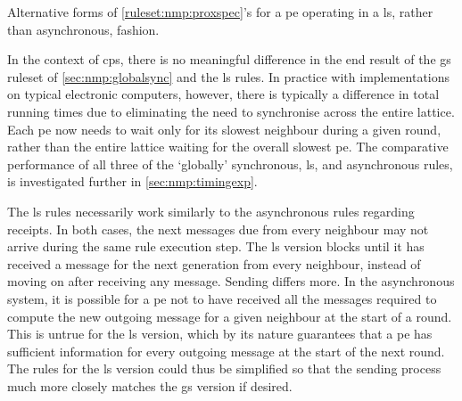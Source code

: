 \begin{cprulesetfloat}
    \begin{cpruleset}
    
        
        
        
    \end{cpruleset}
    \caption[Alternative forms of \cref{ruleset:nmp:proxspec}'s Rule 10]{\label{ruleset:nmp:localsync}Alternative forms of \cref{ruleset:nmp:proxspec}'s  for a \gls{pe} operating in a \gls{ls}, rather than asynchronous, fashion.}
\end{cprulesetfloat}

In the context of \gls{cps}, there is no meaningful difference in the end result of the \gls{gs} \gls{ruleset} of \cref{sec:nmp:globalsync} and the \gls{ls} rules.  In practice with implementations on typical electronic computers, however, there is typically a difference in total running times due to eliminating the need to synchronise across the entire lattice.  Each \gls{pe} now needs to wait only for its slowest neighbour during a given round, rather than the entire lattice waiting for the overall slowest \gls{pe}.  The comparative performance of all three of the `globally' synchronous, \gls{ls}, and asynchronous rules, is investigated further in \cref{sec:nmp:timingexp}.

The \gls{ls} rules necessarily work similarly to the asynchronous rules regarding receipts.  In both cases, the next messages due from every neighbour may not arrive during the same rule execution step.  The \gls{ls} version blocks until it has received a message for the next generation from every neighbour, instead of moving on after receiving any message.  Sending differs more.  In the asynchronous system, it is possible for a \gls{pe} not to have received all the messages required to compute the new outgoing message for a given neighbour at the start of a round.  This is untrue for the \gls{ls} version, which by its nature guarantees that a \gls{pe} has sufficient information for every outgoing message at the start of the next round.  The rules for the \gls{ls} version could thus be simplified so that the sending process much more closely matches the \gls{gs} version if desired.


